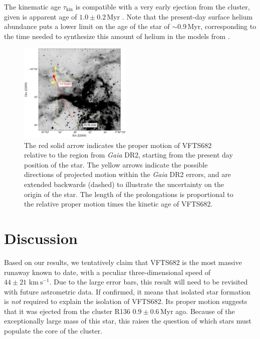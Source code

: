 \documentclass[apjl,twocolumn]{emulateapj}
\newcommand{\todo}[1]{{\large $\blacksquare$~\textbf{\color{red}[#1]}}~$\blacksquare$}
\newcommand{\kms}{{\,\mathrm{km\ s^{-1}}}}
\begin{document}
The kinematic age $\tau_\mathrm{kin}$ is compatible with a very early
ejection from the cluster, given is apparent age
of $1.0\pm 0.2$\,Myr \citep{schneider:18}. %
Note that the
present-day surface helium abundance
\citep[$Y\simeq0.5$,][]{bestenlehner:11, rubio-diez:17} puts a lower
limit on the age of the star of $\sim$0.9\,Myr, corresponding to the time needed to
synthesize this amount of helium in the models from \cite{kohler:15}.

\begin{figure}%
  \centering
  \includegraphics[width=0.48\textwidth]{./figures/main_plot_good_gaia_only}  
  \caption{The red solid arrow indicates the proper motion of VFTS682
    relative to the region from \emph{Gaia} DR2, starting from the present day position of
    the star. The yellow arrows indicate the possible
    directions of projected motion within the \emph{Gaia} DR2 errors, and are extended
    backwards (dashed) to illustrate the uncertainty on the origin of the
    star. The length of the prolongations is proportional to the relative proper motion
    times the kinetic age of VFTS682.
  }
  
  \label{fig:main}
\end{figure}


\section{Discussion}
\label{sec:discussion}

Based on our results, we tentatively claim that VFTS682 is the most massive
runaway known to date, with a peculiar three-dimensional speed of
$44\pm21\,\kms$. Due to the large error bars, this result will need
to be revisited with future astrometric data. %
If confirmed, it means that isolated star formation is
\emph{not} required to explain the isolation of VFTS682. Its proper motion suggests that it was ejected from the cluster R136
$0.9\pm0.6$\,Myr ago. Because of the exceptionally large mass
of this star, this raises the question of which stars must populate
the core of the cluster.
\end{document}

